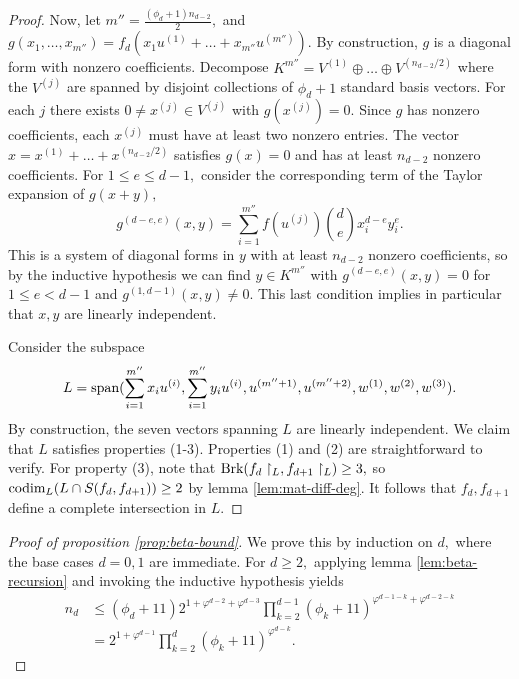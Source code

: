 \documentclass[12pt]{amsart}
\theoremstyle{definition}
\renewcommand{\sp}{\textnormal{span}}
\newcommand{\codim}{\textnormal{codim}}
\newcommand{\brk}{\textnormal{Brk}}
\begin{document}
\begin{proof}
        Now, let $m'' = \frac{(\phi_d+1)n_{d-2}}{2},$ and  $g(x_1,\ldots,x_{m''}) = f_d(x_1u^{(1)}+\ldots+x_{m''}u^{(m'')}).$ By construction, $g$ is a diagonal form with nonzero coefficients. Decompose $K^{m''} = V^{(1)}\oplus\ldots\oplus V^{(n_{d-2}/2)}$ where the $V^{(j)}$ are spanned by disjoint collections of $\phi_d+1$ standard basis vectors. For each $j$ there exists $0\neq x^{(j)}\in V^{(j)}$ with $g(x^{(j)}) = 0.$ Since $g$ has nonzero coefficients, each $x^{(j)}$ must have at least two nonzero entries. The vector $x = x^{(1)}+\ldots+x^{(n_{d-2}/2)}$ satisfies $g(x) = 0$ and has at least $n_{d-2}$ nonzero coefficients. For $1\le e\le d-1,$ consider the corresponding term of the Taylor expansion of $g(x+y),$
        \[
        g^{(d-e,e)}(x,y) =   \sum_{i=1}^{m''} f(u^{(j)}) \binom{d}{e} x_i^{d-e} y_i^e.
        \]
        This is a system of diagonal forms in $y$ with at least $n_{d-2}$ nonzero coefficients, so by the inductive hypothesis we can find $y\in K^{m''}$ with $g^{(d-e,e)}(x,y)  = 0$ for $1\le e< d-1$ and $g^{(1,d-1)} (x,y) \neq 0.$ This last condition implies in particular that $x,y$ are linearly independent. 

        Consider the subspace
        \[
        L = \sp(\sum_{i=1}^{m''}x_iu^{(i)}, \sum_{i=1}^{m''}y_iu^{(i)},u^{(m''+1)}, u^{(m''+2)}, w^{(1)},w^{(2)},w^{(3)}).
        \]
        By construction, the seven vectors spanning $L$ are linearly independent. We claim that $L$
        satisfies properties (1-3). Properties  (1) and (2) are straightforward to verify. For property (3), note that $\brk(f_d\restriction_L, f_{d+1}\restriction_L) \ge 3,$ so  $\codim_L (L\cap S(f_d,f_{d+1})) \ge 2$ by lemma \ref{lem:mat-diff-deg}. It follows that $f_d,f_{d+1}$ define a complete intersection in $L.$ 
    \end{proof}

    \begin{proof}[Proof of proposition \ref{prop:beta-bound}]
        
        We prove this by induction on $d,$ where the base cases $d=0,1$ are immediate. For $d\ge 2,$ applying lemma \ref{lem:beta-recursion} and invoking the inductive hypothesis yields
        \begin{align*}
            n_d &\le (\phi_d+11)2^{1+\varphi^{d-2}+\varphi^{d-3}} \prod_{k=2}^{d-1} (\phi_k+11)^{\varphi^{d-1-k}+\varphi^{d-2-k}} \\
            &= 2^{1+\varphi^{d-1}} \prod_{k=2}^d (\phi_k+11)^{\varphi^{d-k}}.
        \end{align*}
    \end{proof}
\end{document}
